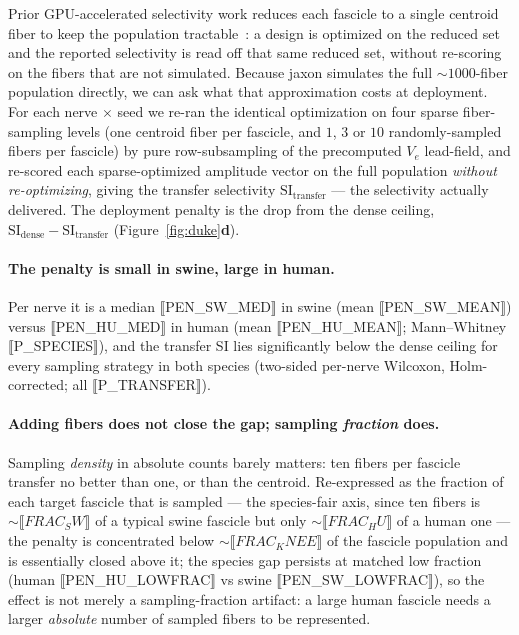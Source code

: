 Prior GPU-accelerated selectivity work reduces each fascicle to a single
centroid fiber to keep the population tractable~\cite{hussain2024axonml}: a design
is optimized on the reduced set and the reported selectivity is read off that
same reduced set, without re-scoring on the fibers that are not simulated.
Because jaxon simulates the full ${\sim}1000$-fiber population directly, we
can ask what that approximation costs at deployment.  For each nerve $\times$
seed we re-ran the identical optimization on four sparse fiber-sampling levels
(one centroid fiber per fascicle, and $1$, $3$ or $10$ randomly-sampled fibers
per fascicle) by pure row-subsampling of the precomputed $V_e$ lead-field, and
re-scored each sparse-optimized amplitude vector on the full population
\emph{without re-optimizing}, giving the transfer selectivity
$\mathrm{SI_{transfer}}$ --- the selectivity actually delivered.  The
deployment penalty is the drop from the dense ceiling,
$\mathrm{SI_{dense}} - \mathrm{SI_{transfer}}$
(Figure~\ref{fig:duke}\textbf{d}).

\paragraph{The penalty is small in swine, large in human.}
Per nerve it is a median ⟦PEN_SW_MED⟧ in swine (mean ⟦PEN_SW_MEAN⟧) versus
⟦PEN_HU_MED⟧ in human (mean ⟦PEN_HU_MEAN⟧; Mann--Whitney ⟦P_SPECIES⟧), and the
transfer SI lies significantly below the dense ceiling for every sampling
strategy in both species (two-sided per-nerve Wilcoxon, Holm-corrected; all
⟦P_TRANSFER⟧).

\paragraph{Adding fibers does not close the gap; sampling \emph{fraction}
  does.}
Sampling \emph{density} in absolute counts barely matters: ten fibers per
fascicle transfer no better than one, or than the centroid.  Re-expressed as
the fraction of each target fascicle that is sampled --- the species-fair axis,
since ten fibers is ${\sim}\!⟦FRAC_SW⟧$ of a typical swine fascicle but only
${\sim}\!⟦FRAC_HU⟧$ of a human one --- the penalty is concentrated below
${\sim}⟦FRAC_KNEE⟧$ of the fascicle population and is essentially closed above
it; the species gap persists at matched low fraction (human ⟦PEN_HU_LOWFRAC⟧
vs swine ⟦PEN_SW_LOWFRAC⟧), so the effect is not merely a sampling-fraction
artifact: a large human fascicle needs a larger \emph{absolute} number of
sampled fibers to be represented.

